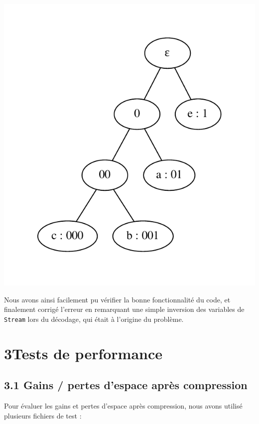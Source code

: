 \documentclass [a4paper,11pt] {report}
\begin{document}
\begin{center}
  \includegraphics[scale=0.75]{test1.pdf}
\end{center}

Nous avons ainsi facilement pu vérifier la bonne fonctionnalité du code, et finalement corrigé l'erreur en remarquant une simple inversion des variables de \lstinline!Stream! lors du décodage, qui était à l'origine du problème.


\section* {3\hspace{5mm}Tests de performance }

\subsection* {3.1\hspace{3mm} Gains / pertes d'espace après compression}

Pour évaluer les gains et pertes d'espace après compression, nous avons utilisé plusieurs fichiers de test :
\end{document}
